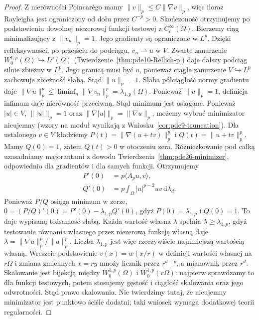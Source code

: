 \begin{proof}
Z nierówności Poincarégo mamy
$\|v\|_p\le C\|\nabla v\|_p$,
więc iloraz Rayleigha jest ograniczony od dołu przez
$C^{-p}>0$. Skończoność otrzymujemy po podstawieniu
dowolnej niezerowej funkcji testowej z $C_c^\infty(\Omega)$.
Bierzemy ciąg minimalizujący z $\|v_n\|_p=1$.
Jego gradienty są ograniczone w $L^p$. Dzięki
refleksywności, po przejściu do podciągu,
$v_n\rightharpoonup u$ w $V$. Zwarte zanurzenie
$W_0^{1,p}(\Omega)\hookrightarrow L^p(\Omega)$
(Twierdzenie~\ref{thm:pde10-Rellich-p})
daje dalszy podciąg silnie zbieżny w $L^p$.
Jego granicą musi być $u$, ponieważ ciągłe
zanurzenie $V\hookrightarrow L^p$ zachowuje
zbieżność słabą. Stąd $\|u\|_p=1$.
Słaba półciągłość normy gradientu daje
$\|\nabla u\|_p^p\le\liminf_n\|\nabla v_n\|_p^p
=\lambda_{1,p}(\Omega)$.
Ponieważ $\|u\|_p=1$, definicja infimum daje
nierówność przeciwną. Stąd minimum jest osiągane.
Ponieważ $|u|\in V$, $\||u|\|_p=1$ oraz
$\|\nabla|u|\|_p=\|\nabla u\|_p$, możemy wybrać
minimizator nieujemny (wzory na moduł wynikają
z Wniosku~\ref{cor:pde9-truncation}).
Dla ustalonego $v\in V$ kładziemy
$P(t)=\|\nabla(u+tv)\|_p^p$ i $Q(t)=\|u+tv\|_p^p$.
Mamy $Q(0)=1$, zatem $Q(t)>0$ w otoczeniu zera.
Różniczkowanie pod całką uzasadniamy majorantami
z dowodu Twierdzenia~\ref{thm:pde26-minimizer},
odpowiednio dla gradientów i dla samych funkcji.
Otrzymujemy
\[
 \begin{aligned}
 P'(0)&=p\langle A_pu,v\rangle,\\
 Q'(0)&=p\int_\Omega |u|^{p-2}uv\,\mathrm d\lambda_d.
 \end{aligned}
\]
Ponieważ $P/Q$ osiąga minimum w zerze,
$0=(P/Q)'(0)=P'(0)-\lambda_{1,p}Q'(0)$,
gdyż $P(0)=\lambda_{1,p}$ i $Q(0)=1$.
To daje wypisaną tożsamość słabą.
Każda wartość własna $\lambda$ spełnia
$\lambda\ge\lambda_{1,p}$, gdyż testowanie równania
własnego przez niezerową funkcję własną daje
$\lambda=\|\nabla u\|_p^p/\|u\|_p^p$.
Liczba $\lambda_{1,p}$ jest więc rzeczywiście
najmniejszą wartością własną.
Wreszcie podstawienie $v(x)=w(x/r)$
w definicji wartości własnej na $r\Omega$ i
zmiana zmiennych $x=ry$ mnoży licznik przez
$r^{d-p}$, a mianownik przez $r^d$. Skalowanie
jest bijekcją między $W_0^{1,p}(\Omega)$ i
$W_0^{1,p}(r\Omega)$: najpierw sprawdzamy to
dla funkcji testowych, potem stosujemy gęstość
i ciągłość skalowania oraz jego odwrotności. Stąd
prawo skalowania. Nie twierdzimy tutaj, że
nieujemny minimizator jest punktowo ściśle dodatni;
taki wniosek wymaga dodatkowej teorii regularności.
\end{proof}


